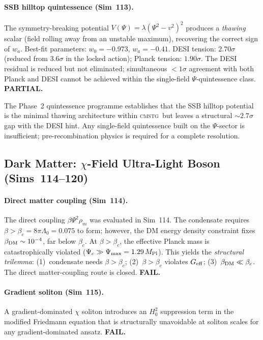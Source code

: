 \documentclass[12pt,a4paper]{article}
\newcommand{\CMSTG}{\textsc{cmstg}}
\newcommand{\Mpl}{M_{\rm Pl}}
\begin{document}
\paragraph{SSB hilltop quintessence (Sim~113).}
The symmetry-breaking potential $V(\Psi)=\lambda(\Psi^2-v^2)^2$ produces a
\emph{thawing} scalar (field rolling away from an unstable maximum), recovering
the correct sign of $w_a$.  Best-fit parameters: $w_0=-0.973$, $w_a=-0.41$.
DESI tension: $2.70\sigma$ (reduced from $3.6\sigma$ in the locked action);
Planck tension: $1.90\sigma$.  The DESI residual is reduced but not eliminated;
simultaneous $<1\sigma$ agreement with both Planck and DESI cannot be achieved
within the single-field $\Psi$-quintessence class.  \textbf{PARTIAL.}

The Phase~2 quintessence programme establishes that the SSB hilltop potential
is the minimal thawing architecture within \CMSTG\ but leaves a structural
$\sim2.7\sigma$ gap with the DESI hint.  Any single-field quintessence built on
the $\Psi$-sector is insufficient; pre-recombination physics is required for a
complete resolution.

\subsection{Dark Matter: $\chi$-Field Ultra-Light Boson (Sims~114--120)}

\paragraph{Direct matter coupling (Sim~114).}
The direct coupling $\beta\Psi^2\rho_m$ was evaluated in Sim~114.  The
condensate requires $\beta>\beta_c=8\pi\Lambda_0=0.075$ to form; however,
the DM energy density constraint fixes $\beta_{\rm DM}\sim10^{-4}$, far below
$\beta_c$.  At $\beta>\beta_c$, the effective Planck mass is catastrophically
violated ($\Psi_c\gg\Psi_{\rm max}=1.29\,\Mpl$).  This yields the
\emph{structural trilemma}: (1)~condensate needs $\beta>\beta_c$;
(2)~$\beta>\beta_c$ violates $G_{\rm eff}$; (3)~$\beta_{\rm DM}\ll\beta_c$.
The direct matter-coupling route is closed.  \textbf{FAIL.}

\paragraph{Gradient soliton (Sim~115).}
A gradient-dominated $\chi$ soliton introduces an $H_0^2$ suppression term in
the modified Friedmann equation that is structurally unavoidable at soliton
scales for any gradient-dominated ansatz.  \textbf{FAIL.}
\end{document}
